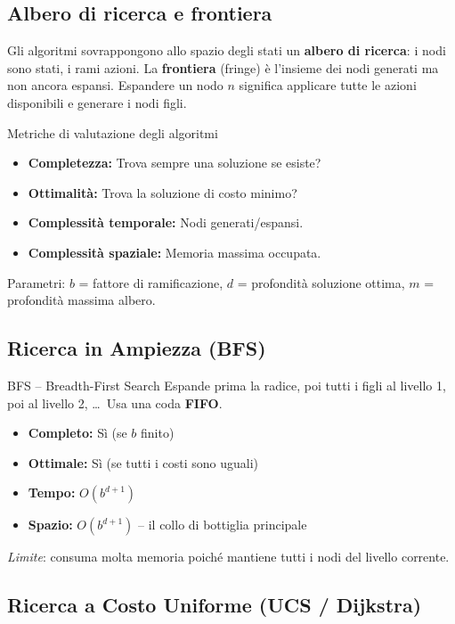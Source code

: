 \documentclass[12pt,a4paper]{article}
\begin{document}
\subsection{Albero di ricerca e frontiera}

Gli algoritmi sovrappongono allo spazio degli stati un \textbf{albero di ricerca}: i nodi sono stati, i rami azioni. La \textbf{frontiera} (fringe) è l'insieme dei nodi generati ma non ancora espansi. Espandere un nodo $n$ significa applicare tutte le azioni disponibili e generare i nodi figli.

\begin{defbox}{Metriche di valutazione degli algoritmi}
\begin{itemize}[noitemsep]
  \item \textbf{Completezza:} Trova sempre una soluzione se esiste?
  \item \textbf{Ottimalità:} Trova la soluzione di costo minimo?
  \item \textbf{Complessità temporale:} Nodi generati/espansi.
  \item \textbf{Complessità spaziale:} Memoria massima occupata.
\end{itemize}
Parametri: $b$ = fattore di ramificazione, $d$ = profondità soluzione ottima, $m$ = profondità massima albero.
\end{defbox}

\subsection{Ricerca in Ampiezza (BFS)}

\begin{thmbox}{BFS -- Breadth-First Search}
Espande prima la radice, poi tutti i figli al livello 1, poi al livello 2, \ldots\ Usa una coda \textbf{FIFO}.

\begin{itemize}[noitemsep]
  \item \textbf{Completo:} Sì (se $b$ finito)
  \item \textbf{Ottimale:} Sì (se tutti i costi sono uguali)
  \item \textbf{Tempo:} $O(b^{d+1})$
  \item \textbf{Spazio:} $O(b^{d+1})$ -- il collo di bottiglia principale
\end{itemize}
\emph{Limite}: consuma molta memoria poiché mantiene tutti i nodi del livello corrente.
\end{thmbox}

\subsection{Ricerca a Costo Uniforme (UCS / Dijkstra)}
\end{document}
